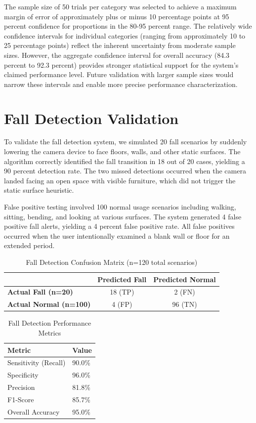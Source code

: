 \documentclass[12pt,a4paper]{report}
\begin{document}
The sample size of 50 trials per category was selected to achieve a maximum margin of error of approximately plus or minus 10 percentage points at 95 percent confidence for proportions in the 80-95 percent range. The relatively wide confidence intervals for individual categories (ranging from approximately 10 to 25 percentage points) reflect the inherent uncertainty from moderate sample sizes. However, the aggregate confidence interval for overall accuracy (84.3 percent to 92.3 percent) provides stronger statistical support for the system's claimed performance level. Future validation with larger sample sizes would narrow these intervals and enable more precise performance characterization.

\section{Fall Detection Validation}

To validate the fall detection system, we simulated 20 fall scenarios by suddenly lowering the camera device to face floors, walls, and other static surfaces. The algorithm correctly identified the fall transition in 18 out of 20 cases, yielding a 90 percent detection rate. The two missed detections occurred when the camera landed facing an open space with visible furniture, which did not trigger the static surface heuristic.

False positive testing involved 100 normal usage scenarios including walking, sitting, bending, and looking at various surfaces. The system generated 4 false positive fall alerts, yielding a 4 percent false positive rate. All false positives occurred when the user intentionally examined a blank wall or floor for an extended period.

\begin{table}[H]
\centering
\caption{Fall Detection Confusion Matrix (n=120 total scenarios)}
\label{tab:fall_confusion}
\begin{tabular}{@{}lcc@{}}
\toprule
 & \textbf{Predicted Fall} & \textbf{Predicted Normal} \\ \midrule
\textbf{Actual Fall (n=20)} & 18 (TP) & 2 (FN) \\
\textbf{Actual Normal (n=100)} & 4 (FP) & 96 (TN) \\ \bottomrule
\end{tabular}
\end{table}

\begin{table}[H]
\centering
\caption{Fall Detection Performance Metrics}
\label{tab:fall_metrics}
\begin{tabular}{@{}ll@{}}
\toprule
\textbf{Metric} & \textbf{Value} \\ \midrule
Sensitivity (Recall) & 90.0\% \\
Specificity & 96.0\% \\
Precision & 81.8\% \\
F1-Score & 85.7\% \\
Overall Accuracy & 95.0\% \\ \bottomrule
\end{tabular}
\end{table}
\end{document}
